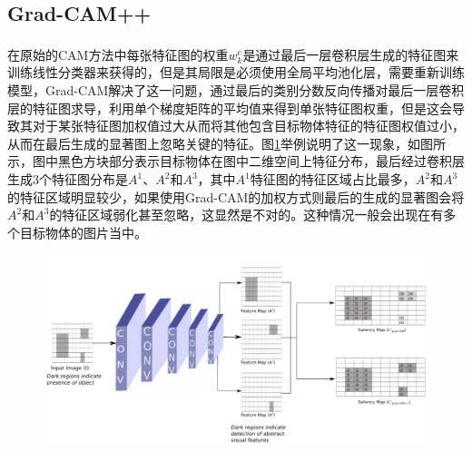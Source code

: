 \subsection{Grad-CAM++}
在原始的CAM\textsuperscript{\cite{zhou2016learning}}方法中每张特征图的权重$w^c_k$是通过最后一层卷积层生成的特征图来训练线性分类器来获得的，但是其局限是必须使用全局平均池化层，需要重新训练模型，Grad-CAM解决了这一问题，通过最后的类别分数反向传播对最后一层卷积层的特征图求导，利用单个梯度矩阵的平均值来得到单张特征图权重，但是这会导致其对于某张特征图加权值过大从而将其他包含目标物体特征的特征图权值过小，从而在最后生成的显著图上忽略关键的特征。图\ref{fig:gradcampp1}举例说明了这一现象，如图所示，图中黑色方块部分表示目标物体在图中二维空间上特征分布，最后经过卷积层生成3个特征图分布是$A^1$、$A^2$和$A^3$，其中$A^1$特征图的特征区域占比最多，$A^2$和$A^3$的特征区域明显较少，如果使用Grad-CAM的加权方式则最后的生成的显著图会将$A^2$和$A^3$的特征区域弱化甚至忽略，这显然是不对的。这种情况一般会出现在有多个目标物体的图片当中。
\begin{figure}[h]
	\centering 
	\includegraphics[width=15cm ]{fig/ch2/gradcampp1.png}
	\label{fig:gradcampp1}
\end{figure}


